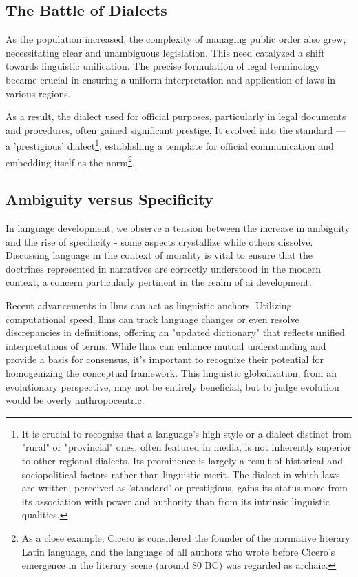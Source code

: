 \documentclass[11pt,a4]{article}
\begin{document}
\subsection{The Battle of Dialects}
    As the population increased, the complexity of managing public order also grew,
    necessitating clear and unambiguous legislation. This need catalyzed a shift towards
     linguistic unification. The precise formulation of legal terminology became crucial
     in ensuring a uniform interpretation and application of laws in various regions.
    \par
    As a result, the dialect used for official purposes, particularly in legal documents
    and procedures, often gained significant prestige. It evolved into the
    standard — a 'prestigious' dialect\footnote{It is crucial to recognize that a
    language's high style or a dialect distinct from "rural" or "provincial" ones,
    often featured in media, is not inherently superior to other regional dialects.
    Its prominence is largely a result of historical and sociopolitical factors rather
    than linguistic merit. The dialect in which laws are written, perceived as 'standard'
    or prestigious, gains its status more from its association with power and authority
    than from its intrinsic linguistic qualities.}, establishing a template for official
    communication and embedding itself as the norm\footnote{As a close example,
    Cicero is considered the founder of the normative literary Latin language, and the
    language of all authors who wrote before Cicero's emergence in the literary
    scene (around 80 BC) was regarded as archaic.
    }.



\subsection{Ambiguity versus Specificity}
    In language development, we observe a tension between the increase in ambiguity and the rise of
    specificity - some aspects crystallize while others dissolve. Discussing language in the context
    of morality is vital to ensure that the doctrines represented in narratives are correctly understood
    in the modern context, a concern particularly pertinent in the realm of \acrshort{ai} development.
    \par
    Recent advancements in \glspl{llm} can act as linguistic anchors.
    Utilizing computational speed, \glspl{llm}  can track language changes or even resolve discrepancies
    in definitions, offering an "updated dictionary" that reflects unified interpretations of terms.
     While \glspl{llm}  can enhance mutual understanding and provide a basis for consensus,
     it's important to recognize their potential for homogenizing the conceptual framework.
     This linguistic globalization, from an evolutionary perspective, may not be entirely beneficial,
     but to judge evolution would be overly anthropocentric.
\end{document}
